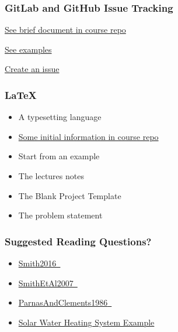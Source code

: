 \documentclass[t,12pt,numbers,fleqn]{beamer}
\begin{document}

\begin{frame}
\frametitle{GitLab and GitHub Issue Tracking}

\bi
\item \href{https://gitlab.cas.mcmaster.ca/smiths/cas741/tree/master/ToolTutorials/gitAndGitLab}{See brief document in course repo}
\item \href{https://github.com/JacquesCarette/literate-scientific-software/issues}{See
  examples}
\item \href{https://gitlab.cas.mcmaster.ca/smiths/cas741/issues}{Create an issue}
\ei

\end{frame}


\begin{frame}
\frametitle{LaTeX}
\begin{itemize}
\item A typesetting language
\item \href{https://gitlab.cas.mcmaster.ca/smiths/cas741/tree/master/ToolTutorials/LaTeX}{Some initial information in course repo}
\item Start from an example
\bi
\item The lectures notes
\item The Blank Project Template
\item The problem statement
\ei
\end{itemize}
\end{frame}


\begin{frame}
\frametitle{Suggested Reading Questions?}

\begin {itemize}

\item
  \href{https://gitlab.cas.mcmaster.ca/smiths/cas741/blob/master/ReferenceMaterial/SoftEngForScienceBook.pdf}
  {Smith2016~\cite{Smith2016}}
\item
  \href{https://gitlab.cas.mcmaster.ca/smiths/cas741/blob/master/ReferenceMaterial/SmithLaiAndKhedri2007fulltext.pdf}
  {SmithEtAl2007~\cite{SmithEtAl2007}}
\item
  \href{https://gitlab.cas.mcmaster.ca/smiths/cas741/blob/master/ReferenceMaterial/ParnasAndClements1986.pdf}
  {{ParnasAndClements1986}~\cite{ParnasAndClements1986}}
\item \href{https://github.com/smiths/swhs}{Solar Water Heating System Example}

\end{itemize}

\end{frame}
\end{document}
